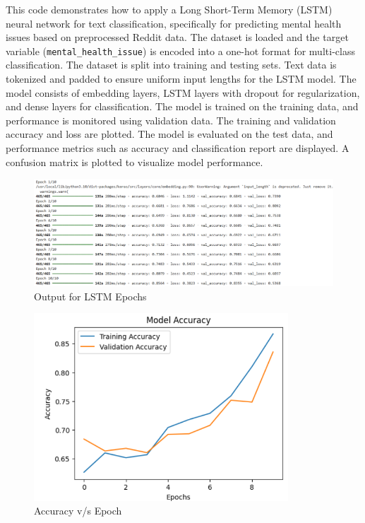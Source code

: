 \noindent
This code demonstrates how to apply a Long Short-Term Memory (LSTM) neural network for text classification, specifically for predicting mental health issues based on preprocessed Reddit data. The dataset is loaded and the target variable (\texttt{mental\_health\_issue}) is encoded into a one-hot format for multi-class classification. The dataset is split into training and testing sets. Text data is tokenized and padded to ensure uniform input lengths for the LSTM model. The model consists of embedding layers, LSTM layers with dropout for regularization, and dense layers for classification. The model is trained on the training data, and performance is monitored using validation data. The training and validation accuracy and loss are plotted. The model is evaluated on the test data, and performance metrics such as accuracy and classification report are displayed. A confusion matrix is plotted to visualize model performance.


\begin{figure}[h!]  
    \centering
    \includegraphics[width=1.0\textwidth]{Images/LSTM Epoch.png}  
    \caption{Output for LSTM Epochs}
    \label{LSTm Epochs}  %
\end{figure}

\begin{figure}[h!]  
    \centering
    \includegraphics[width=0.85\textwidth]{Images/LSTM Accuracy v Epoch.png}  
    \caption{Accuracy v/s Epoch}
    \label{Accuracy vs Epoch LSTM}  %
\end{figure}

